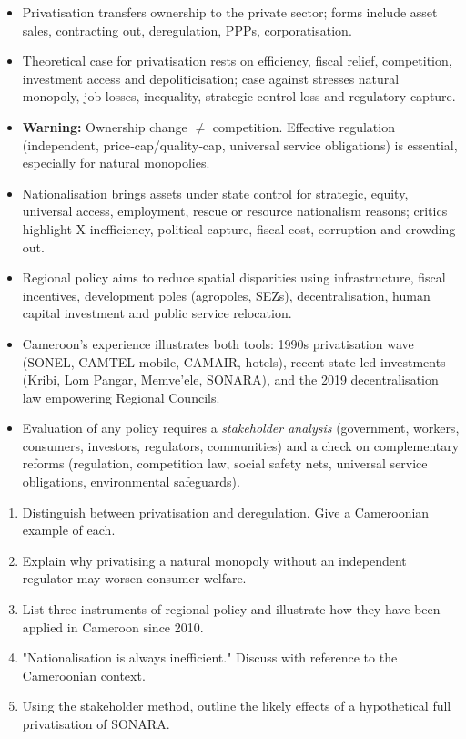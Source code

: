 \documentclass[11pt]{article}
\begin{document}
\begin{aretenir}
\begin{itemize}
    \item Privatisation transfers ownership to the private sector; forms include asset sales, contracting out, deregulation, PPPs, corporatisation.
    \item Theoretical case for privatisation rests on efficiency, fiscal relief, competition, investment access and depoliticisation; case against stresses natural monopoly, job losses, inequality, strategic control loss and regulatory capture.
    \item \textbf{Warning:} Ownership change $\neq$ competition.  Effective regulation (independent, price‑cap/quality‑cap, universal service obligations) is essential, especially for natural monopolies.
    \item Nationalisation brings assets under state control for strategic, equity, universal access, employment, rescue or resource nationalism reasons; critics highlight X‑inefficiency, political capture, fiscal cost, corruption and crowding out.
    \item Regional policy aims to reduce spatial disparities using infrastructure, fiscal incentives, development poles (agropoles, SEZs), decentralisation, human capital investment and public service relocation.
    \item Cameroon's experience illustrates both tools: 1990s privatisation wave (SONEL, CAMTEL mobile, CAMAIR, hotels), recent state‑led investments (Kribi, Lom Pangar, Memve'ele, SONARA), and the 2019 decentralisation law empowering Regional Councils.
    \item Evaluation of any policy requires a \emph{stakeholder analysis} (government, workers, consumers, investors, regulators, communities) and a check on complementary reforms (regulation, competition law, social safety nets, universal service obligations, environmental safeguards).
\end{itemize}
\end{aretenir}

\begin{exercice}
\begin{enumerate}
    \item Distinguish between privatisation and deregulation.  Give a Cameroonian example of each.
    \item Explain why privatising a natural monopoly without an independent regulator may worsen consumer welfare.
    \item List three instruments of regional policy and illustrate how they have been applied in Cameroon since 2010.
    \item "Nationalisation is always inefficient."  Discuss with reference to the Cameroonian context.
    \item Using the stakeholder method, outline the likely effects of a hypothetical full privatisation of SONARA.
\end{enumerate}
\end{exercice}
\end{document}
